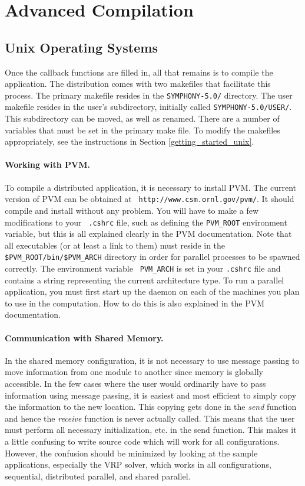 \section{Advanced Compilation}
\label{advanced-compilation}

\subsection{Unix Operating Systems}

Once the callback functions are filled in, all that remains is to compile the
application. The distribution comes with two makefiles that facilitate this
process. The primary makefile resides in the {\tt SYMPHONY-5.0/} directory.
The user makefile resides in the user's subdirectory, initially called
\texttt{SYMPHONY-5.0/USER/}. This subdirectory can be moved, as well as
renamed. There are a number of variables that must be set in the primary make
file. To modify the makefiles appropriately, see the instructions in Section
\ref{getting_started_unix}.

\paragraph{Working with PVM.}
\label{PVM}
To compile a distributed application, it is necessary to install PVM.
The current version of PVM can be obtained at {\tt
{}
{http://www.csm.ornl.gov/pvm/}}. It should compile and install without
any problem. You will have to make a few modifications to your {\tt
.cshrc} file, such as defining the {\tt PVM\_ROOT} environment
variable, but this is all explained clearly in the PVM documentation.
Note that all executables (or at least a link to them) must reside in
the {\tt \$PVM\_ROOT/bin/\$PVM\_ARCH} directory in order for parallel
processes to be spawned correctly. The environment variable {\tt
PVM\_ARCH} is set in your {\tt .cshrc} file and contains a string
representing the current architecture type. To run a parallel
application, you must first start up the daemon on each of the
machines you plan to use in the computation. How to do this is also
explained in the PVM documentation.

\paragraph{Communication with Shared Memory.}
\label{shared}
In the shared memory configuration, it is not necessary to use
message passing to move information from one module to another since
memory is globally accessible. In the few cases where the user would
ordinarily have to pass information using message passing, it is
easiest and most efficient to simply copy the information to the new
location. This copying gets done in the {\em send} function and hence
the {\em receive} function is never actually called. This means that
the user must perform all necessary initialization, etc. in the send
function. This makes it a little confusing to write source code which
will work for all configurations. However, the confusion should be
minimized by looking at the sample applications, especially the VRP solver,
which works in all configurations, sequential, distributed parallel, and
shared parallel. 

